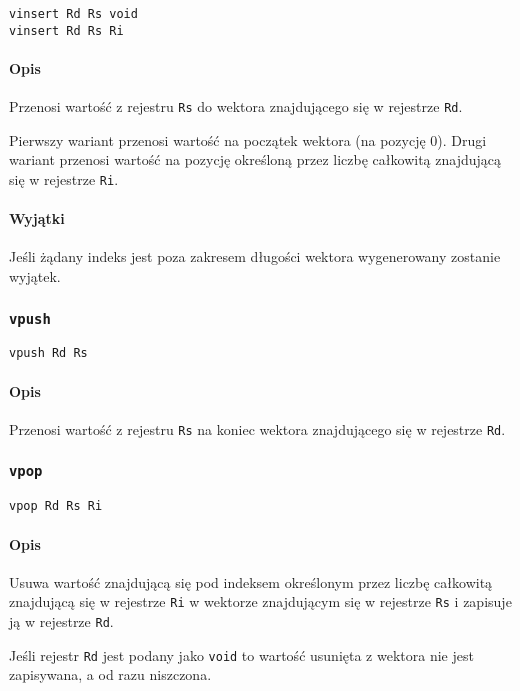 \begin{lstlisting}
vinsert Rd Rs void
vinsert Rd Rs Ri
\end{lstlisting}

\paragraph*{Opis} Przenosi wartość z rejestru \texttt{Rs} do wektora
znajdującego się w rejestrze \texttt{Rd}.

Pierwszy wariant przenosi wartość na początek wektora (na pozycję 0).
Drugi wariant przenosi wartość na pozycję określoną przez liczbę całkowitą
znajdującą się w rejestrze \texttt{Ri}.

\paragraph*{Wyjątki} Jeśli żądany indeks jest poza zakresem długości wektora
wygenerowany zostanie wyjątek.

\subsubsection{\texttt{vpush}}

\begin{lstlisting}
vpush Rd Rs
\end{lstlisting}

\paragraph*{Opis} Przenosi wartość z rejestru \texttt{Rs} na koniec wektora
znajdującego się w rejestrze \texttt{Rd}.

\subsubsection{\texttt{vpop}}

\begin{lstlisting}
vpop Rd Rs Ri
\end{lstlisting}

\paragraph*{Opis} Usuwa wartość znajdującą się pod indeksem określonym przez
liczbę całkowitą znajdującą się w rejestrze \texttt{Ri} w wektorze znajdującym
się w rejestrze \texttt{Rs} i zapisuje ją w rejestrze \texttt{Rd}.

Jeśli rejestr \texttt{Rd} jest podany jako \texttt{void} to wartość usunięta z
wektora nie jest zapisywana, a od razu niszczona.

